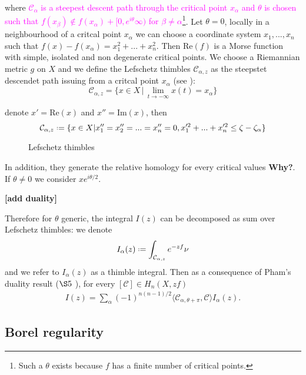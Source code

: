 \documentclass[11pt,a4paper,twoside,leqno,noamsfonts]{amsart}
\numberwithin{equation}{section}
\begin{document}
where \textcolor{magenta}{ $\mathcal{C}_\alpha$ is a steepest descent path through the critical point $x_\alpha$ and $\theta$ is chosen such that $f(x_\beta)\notin f(x_\alpha)+[0,e^{i\theta}\infty)$ for $\beta\neq\alpha$}\footnote{Such a $\theta$ exists because $f$ has a finite number of critical points.}.
\color{magenta}
Let $\theta=0$, locally in a neighbourhood of a critcal point $x_\alpha$ we can choose a coordinate system $x_1,...,x_n$ such that $f(x)-f(x_\alpha)=x_1^2+...+x_n^2$. Then $\mathrm{Re}(f)$ is a Morse function with simple, isolated and non degenerate critical points. We choose a Riemannian metric $g$ on $X$ and we define the Lefschetz thimbles $\mathcal{C}_{\alpha,z}$ as the steepstet descendet path issuing from a critcal point $x_\alpha$ (see \cite{pham}\cite{Witten}): 
\begin{equation}
\mathcal{C}_{\alpha,z}=\lbrace x\in X\,\big\vert \, \lim_{t\to -\infty} x(t)=x_\alpha\rbrace
\end{equation}

denote $x'=\mathrm{Re}(x)$ and $x''=\mathrm{Im}(x)$, then 
\begin{equation}
\mathcal{C}_{\alpha,z}\defeq\lbrace x\in X\vert x_1''=x_2''=...=x_n''=0, x_1'^2+...+x_n'^2\leq \zeta-\zeta_\alpha\rbrace
\end{equation}
\begin{figure}
\caption{Lefschetz thimbles}\label{Lefschetz_thimbles}
\end{figure}
In addition, they generate the relative homology for every critical values \textbf{Why?}. If $\theta\neq 0$ we consider $xe^{i\theta/2}$. 

\textbf{[add duality]}  
\color{black}

Therefore for $\theta$ generic, the integral $I(z)$ can be decomposed as sum over Lefschetz thimbles: we denote 
\begin{equation}\label{int_alpha}
I_{\alpha}(z)\defeq\int_{\mathcal{C}_{\alpha,z}}e^{-zf}\nu
\end{equation}
and we refer to $I_{\alpha}(z)$ as a thimble integral. Then as a consequence of Pham's duality result ($\S 5$ \cite{pham}), for every $[\mathcal{C}]\in H_n(X,zf)$
\begin{align*}
I(z)=\sum_{\alpha}(-1)^{n(n-1)/2}\langle \mathcal{C}_{\alpha,\theta+\pi},\mathcal{C}\rangle I_{\alpha}(z). 
\end{align*}


\subsection{Borel regularity}
\end{document}
